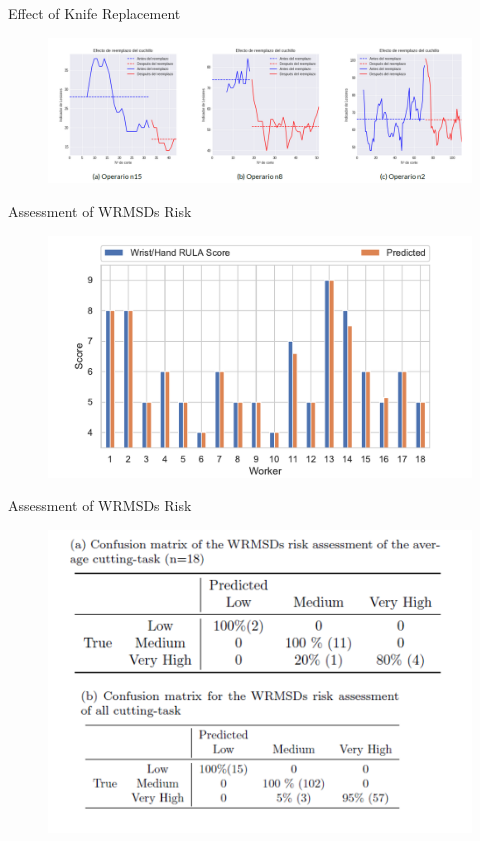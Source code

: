 \begin{frame}{Effect of Knife Replacement}
    \begin{figure}
        \includegraphics[scale=0.6]{img/results/knife_effect.png}
    \end{figure}
\end{frame}



\begin{frame}{Assessment of WRMSDs Risk}
    \begin{figure}
        \includegraphics[scale=0.6]{img/results/rula_scores_predicted.pdf}
    \end{figure}
\end{frame}

\begin{frame}{Assessment of WRMSDs Risk}
    \begin{figure}
        \includegraphics[scale=0.6]{img/results/decision_making.png}
    \end{figure}
\end{frame}